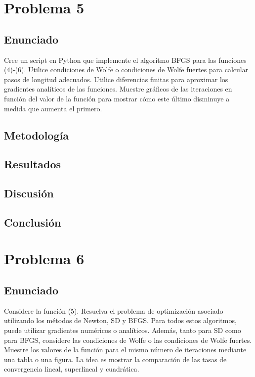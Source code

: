\documentclass{article}
\begin{document}
\section{Problema 5}

\subsection{Enunciado}

Cree un script en Python que implemente el algoritmo BFGS para las funciones (4)-(6). Utilice condiciones de Wolfe o condiciones de Wolfe fuertes para calcular pasos de longitud adecuados. Utilice diferencias finitas para aproximar los gradientes analíticos de las funciones. Muestre gráficos de las iteraciones en función del valor de la función para mostrar cómo este último disminuye a medida que aumenta el primero.

\subsection{Metodología}

\subsection{Resultados}
\setcounter{equation}{0}

\subsection{Discusión}

\subsection{Conclusión}

\section{Problema 6}

\subsection{Enunciado}

Considere la función (5). Resuelva el problema de optimización asociado utilizando los métodos de Newton, SD y BFGS. Para todos estos algoritmos, puede utilizar gradientes numéricos o analíticos. Además, tanto para SD como para BFGS, considere las condiciones de Wolfe o las condiciones de Wolfe fuertes. Muestre los valores de la función para el mismo número de iteraciones mediante una tabla o una figura. La idea es mostrar la comparación de las tasas de convergencia lineal, superlineal y cuadrática.
\end{document}

